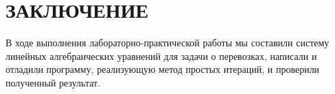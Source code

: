 \documentclass[14pt]{extarticle}
\begin{document}

\clearpage

\section{\MakeUppercase{Заключение}}

В ходе выполнения лабораторно-практической работы мы составили систему линейных алгебраических уравнений для задачи о перевозках, написали и отладили программу, реализующую метод простых итераций, и проверили полученный результат.
\end{document}
